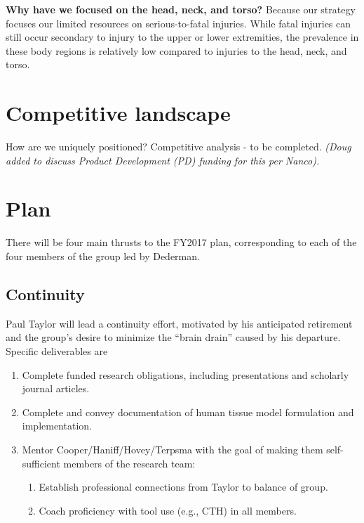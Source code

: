 \documentclass[12pt,reqno]{amsart}
\begin{document}
{\bf Why have we focused on the head, neck, and torso?}  Because our strategy 
focuses our limited resources on serious-to-fatal injuries.  While fatal 
injuries can still occur secondary to injury to the upper or lower 
extremities, the prevalence in these body regions is relatively low 
compared to injuries to the head, neck, and torso.  


\section{Competitive landscape}

How are we uniquely positioned?
Competitive analysis - to be completed.
{\em
(Doug added to discuss Product Development (PD) funding for this per Nanco).
}

\section{Plan}
There will be four main thrusts to the FY2017 plan, corresponding to
each of the four members of the group led by Dederman.  

\subsection{Continuity} Paul Taylor will lead a continuity effort, 
motivated by his anticipated retirement and the group's desire to
minimize the ``brain drain'' caused by his departure.  Specific 
deliverables are
\begin{enumerate}
\item Complete funded research obligations, including presentations and
scholarly journal articles.
\item Complete and convey documentation of human tissue model formulation and 
implementation.
\item Mentor Cooper/Haniff/Hovey/Terpsma with the goal of making them 
self-sufficient members of the research team:
	\begin{enumerate}
	\item Establish professional connections from Taylor to 
	balance of group.
	\item Coach proficiency with tool use (e.g., CTH) in all members.
	\end{enumerate}
\end{enumerate}
\end{document}
